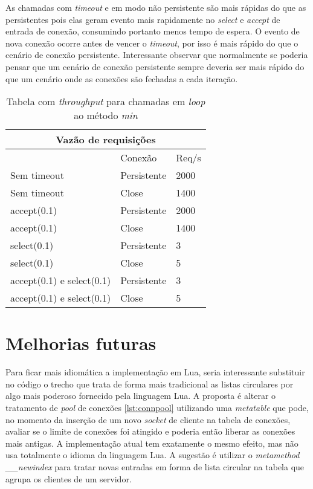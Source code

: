 \documentclass[11pt]{article}
\begin{document}
As chamadas com \textit{timeout} e em modo não persistente são mais rápidas do
que as persistentes pois elas geram evento mais rapidamente no \textit{select} e
\textit{accept} de entrada de conexão, consumindo portanto menos tempo de
espera. O evento de nova conexão ocorre antes de vencer o \textit{timeout}, por
isso é mais rápido do que o cenário de conexão persistente. Interessante
observar que normalmente se poderia pensar que um cenário de conexão persistente
sempre deveria ser mais rápido do que um cenário onde as conexões são fechadas a
cada iteração.

\renewcommand{\arraystretch}{2}
\begin{table}
\begin{center}
{\footnotesize \begin{tabular}{p{3.5cm} p{2.5cm} p{2.5cm}}
\hline
\multicolumn{3}{c}{Vazão de requisições} \\ \hline
~ & Conexão & Req/s \\ \hline
Sem timeout & Persistente & 2000 \\
Sem timeout & Close & 1400 \\
accept(0.1) & Persistente & 2000 \\
accept(0.1) & Close & 1400 \\
select(0.1) & Persistente & 3 \\
select(0.1) & Close & 5 \\
accept(0.1) e select(0.1) & Persistente & 3 \\
accept(0.1) e select(0.1) & Close & 5 \\
\hline
\end{tabular}}
\caption{Tabela com \textit{throughput} para chamadas em \textit{loop} ao método
\textit{min}}
\label{tab:perfpool}
\end{center}
\end{table}

\section{Melhorias futuras}\label{sec:future}

Para ficar mais idiomática a implementação em Lua, seria interessante substituir
no código o trecho que trata de forma mais tradicional as listas circulares por
algo mais poderoso fornecido pela linguagem Lua. A proposta é alterar o
tratamento de \textit{pool} de conexões \ref{lst:connpool} utilizando uma
\textit{metatable} \cite{metat} que pode, no momento da inserção de um novo
\textit{socket} de cliente na tabela de conexões, avaliar se o limite de
conexões foi atingido e poderia então liberar as conexões mais antigas. A
implementação atual tem exatamente o mesmo efeito, mas não usa totalmente o
idioma da linguagem Lua. A sugestão é utilizar o \textit{metamethod
\_\_newindex} para tratar novas entradas em forma de lista circular na tabela
que agrupa os clientes de um servidor.
\end{document}
